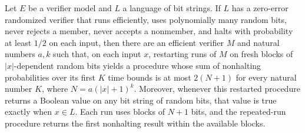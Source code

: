 \begin{theorem}
\label{Randomized.InZPP.restart}
\leanok
{}
Let $E$ be a verifier model and $L$ a language of bit strings. If $L$ has a zero-error
randomized verifier that runs efficiently, uses polynomially many random bits, never
rejects a member, never accepts a nonmember, and halts with probability at least $1/2$
on each input, then there are an efficient verifier $M$ and natural numbers $a,k$ such
that, on each input $x$, restarting runs of $M$ on fresh blocks of $|x|$-dependent
random bits yields a procedure whose sum of nonhalting probabilities over its first $K$
time bounds is at most $2(N+1)$ for every natural number $K$, where $N=a(|x|+1)^k$.
Moreover, whenever this restarted procedure returns a Boolean value on any bit string of
random bits, that value is true exactly when $x\in L$. Each run uses blocks of $N+1$
bits, and the repeated-run procedure returns the first nonhalting result within the
available blocks.
\end{theorem}
